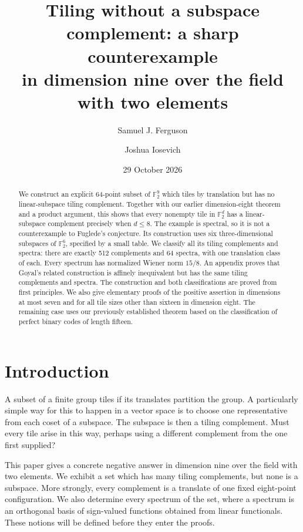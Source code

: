 \documentclass[11pt]{article}
\title{\Large\bfseries Tiling without a subspace complement: a sharp counterexample\\
in dimension nine over the field with two elements}
\author{Samuel J. Ferguson \and Joshua Iosevich}
\date{29 October 2026}
\numberwithin{equation}{section}
\theoremstyle{definition}
\theoremstyle{remark}\newtheorem{remark}[theorem]{Remark}
\begin{document}
\maketitle
\begin{abstract}
We construct an explicit 64-point subset of $\mathbb F_2^9$ which tiles by translation but has no linear-subspace tiling complement. Together with our earlier dimension-eight theorem and a product argument, this shows that every nonempty tile in $\mathbb F_2^d$ has a linear-subspace complement precisely when $d\le8$. The example is spectral, so it is not a counterexample to Fuglede's conjecture. Its construction uses six three-dimensional subspaces of $\mathbb F_2^6$, specified by a small table. We classify all its tiling complements and spectra: there are exactly 512 complements and 64 spectra, with one translation class of each. Every spectrum has normalized Wiener norm $15/8$. An appendix proves that Goyal's related construction is affinely inequivalent but has the same tiling complements and spectra. The construction and both classifications are proved from first principles. We also give elementary proofs of the positive assertion in dimensions at most seven and for all tile sizes other than sixteen in dimension eight. The remaining case uses our previously established theorem based on the classification of perfect binary codes of length fifteen.
\end{abstract}
\setcounter{tocdepth}{1}{\small\tableofcontents}
\clearpage

\section{Introduction}
A subset of a finite group tiles if its translates partition the group. A particularly simple way for this to happen in a vector space is to choose one representative from each coset of a subspace. The subspace is then a tiling complement. Must every tile arise in this way, perhaps using a different complement from the one first supplied?

This paper gives a concrete negative answer in dimension nine over the field with two elements. We exhibit a set which has many tiling complements, but none is a subspace. More strongly, every complement is a translate of one fixed eight-point configuration. We also determine every spectrum of the set, where a spectrum is an orthogonal basis of sign-valued functions obtained from linear functionals. These notions will be defined before they enter the proofs.
\end{document}
